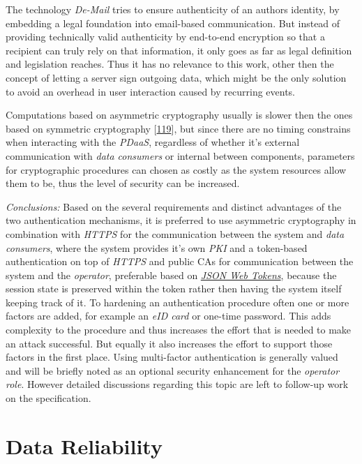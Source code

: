 \documentclass[12pt,english,a4paper,titlepage,cleardoublepage=empty,dottedtoc]{report}
\begin{document}
The technology \emph{De-Mail} tries to ensure authenticity of an authors
identity, by embedding a legal foundation into email-based
communication. But instead of providing technically valid authenticity
by end-to-end encryption so that a recipient can truly rely on that
information, it only goes as far as legal definition and legislation
reaches. Thus it has no relevance to this work, other then the concept
of letting a server sign outgoing data, which might be the only solution
to avoid an overhead in user interaction caused by recurring events.

Computations based on asymmetric cryptography usually is slower then the
ones based on symmetric cryptography
{[}\protect\hyperlink{ref-book_2014_chapter-10-5-asym-random-number-gen}{119}{]},
but since there are no timing constrains when interacting with the
\emph{PDaaS}, regardless of whether it's external communication with
\emph{data consumers} or internal between components, parameters for
cryptographic procedures can chosen as costly as the system resources
allow them to be, thus the level of security can be increased.

\emph{Conclusions:} Based on the several requirements and distinct
advantages of the two authentication mechanisms, it is preferred to use
asymmetric cryptography in combination with \emph{HTTPS} for the
communication between the system and \emph{data consumers}, where the
system provides it's own \emph{PKI} and a token-based authentication on
top of \emph{HTTPS} and public CAs for communication between the system
and the \emph{operator}, preferable based on
\emph{\protect\hyperlink{link_jwt}{JSON Web Tokens}}, because the
session state is preserved within the token rather then having the
system itself keeping track of it. To hardening an authentication
procedure often one or more factors are added, for example an \emph{eID
card} or one-time password. This adds complexity to the procedure and
thus increases the effort that is needed to make an attack successful.
But equally it also increases the effort to support those factors in the
first place. Using multi-factor authentication is generally valued and
will be briefly noted as an optional security enhancement for the
\emph{operator role}. However detailed discussions regarding this topic
are left to follow-up work on the specification.

\section{Data Reliability}\label{data-reliability}
\end{document}
